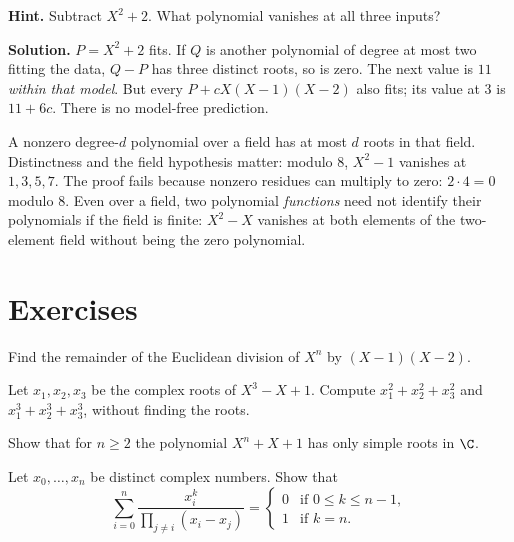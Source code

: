 \textbf{Hint.} Subtract $X^2+2$. What polynomial vanishes at all three inputs?

\textbf{Solution.} $P=X^2+2$ fits. If $Q$ is another polynomial of degree at most two fitting the data, $Q-P$ has three distinct roots, so is zero. The next value is $11$ \emph{within that model}. But every $P+cX(X-1)(X-2)$ also fits; its value at $3$ is $11+6c$. There is no model-free prediction.

\begin{reminder}
A nonzero degree-$d$ polynomial over a field has at most $d$ roots in that field. Distinctness and the field hypothesis matter: modulo $8$, $X^2-1$ vanishes at $1,3,5,7$. The proof fails because nonzero residues can multiply to zero: $2\cdot4=0$ modulo $8$. Even over a field, two polynomial \emph{functions} need not identify their polynomials if the field is finite: $X^2-X$ vanishes at both elements of the two-element field without being the zero polynomial.
\end{reminder}



\section{Exercises}

\begin{exercise}[$\star$]\label{ex:rem}
Find the remainder of the Euclidean division of $X^n$ by $(X-1)(X-2)$.
\end{exercise}

\begin{exercise}[$\star$]\label{ex:viete}
Let $x_1,x_2,x_3$ be the complex roots of $X^3-X+1$. Compute $x_1^2+x_2^2+x_3^2$ and $x_1^3+x_2^3+x_3^3$, without finding the roots.
\end{exercise}

\begin{exercise}[$\star\star$]\label{ex:simple}
Show that for $n\ge2$ the polynomial $X^n+X+1$ has only simple roots in $\C$.
\end{exercise}

\begin{exercise}[$\star\star$]\label{ex:lagsum}
Let $x_0,\dots,x_n$ be distinct complex numbers. Show that
\[
\sum_{i=0}^n\frac{x_i^k}{\prod_{j\ne i}(x_i-x_j)}=\begin{cases}0&\text{if }0\le k\le n-1,\\1&\text{if }k=n.\end{cases}
\]
\end{exercise}

